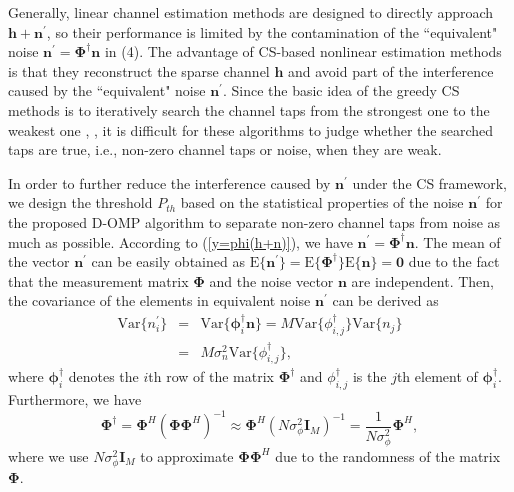 \documentclass[conference]{IEEEtran}
\begin{document}
Generally, linear channel estimation methods are designed to directly approach $\mathbf{h}+\mathbf{n}^{'}$, so their performance is limited by the contamination of the ``equivalent" noise $\mathbf{n}^{'}=\mathbf{\Phi}^{\dagger}\mathbf{n}$ in (4).
The advantage of CS-based nonlinear estimation methods is that they reconstruct the sparse channel $\mathbf{h}$ and avoid part of the interference caused by the ``equivalent" noise $\mathbf{n}^{'}$.
Since the basic idea of the greedy CS methods is to iteratively search the channel taps from the strongest one to the weakest one \cite{CSCE}, \cite{A-SOMP}, it is difficult for these algorithms to judge whether the searched taps are true, i.e., non-zero channel taps or noise, when they are weak.

In order to further reduce the interference caused by $\mathbf{n}^{'}$ under the CS framework, we design the threshold $P_{th}$ based on the statistical properties of the noise $\mathbf{n}^{'}$ for the proposed D-OMP algorithm to separate non-zero channel taps from noise as much as possible.
According to (\ref{y=phi(h+n)}), we have $\mathbf{n}^{'}=\mathbf{\Phi}^{\dagger}\mathbf{n}$.
The mean of the vector $\mathbf{n}^{'}$ can be easily obtained as $\text{E}\{\mathbf{n}^{'}\}=\text{E}\{\mathbf{\Phi}^{\dagger}\}\text{E}\{\mathbf{n}\}=\mathbf{0}$ due to the fact that the measurement matrix $\mathbf{\Phi}$ and the noise vector $\mathbf{n}$ are independent.
Then, the covariance of the elements in equivalent noise $\mathbf{n}^{'}$ can be derived as %
\begin{eqnarray}
\text{Var}\{n_i^{'}\}&=& \text{Var}\{\boldsymbol{\phi}_{i}^{\dagger}\mathbf{n}\}= M\text{Var}\{\phi_{i,j}^{\dagger}\}\text{Var}\{n_j\}\nonumber\\
&=&M\sigma_n^2\text{Var}\{\phi_{i,j}^{\dagger}\},
\end{eqnarray}
where $\boldsymbol{\phi}_{i}^{\dagger}$ denotes the $i$th row of the matrix $\mathbf{\Phi}^{\dagger}$ and $\phi_{i,j}^{\dagger}$ is the $j$th element of $\boldsymbol{\phi}_{i}^{\dagger}$. Furthermore, we have
\begin{equation}
\mathbf{\Phi}^{\dagger}=\mathbf{\Phi}^H(\mathbf{\Phi}\mathbf{\Phi}^H)^{-1}
\approx\mathbf{\Phi}^H(N\sigma_{\phi}^2\mathbf{I}_M)^{-1}
=\frac{1}{N\sigma_{\phi}^2}\mathbf{\Phi}^H,
\end{equation}
where we use $N\sigma_{\phi}^2\mathbf{I}_M$ to approximate $\mathbf{\Phi}\mathbf{\Phi}^H$ due to the randomness of the matrix $\mathbf{\Phi}$.
\end{document}
